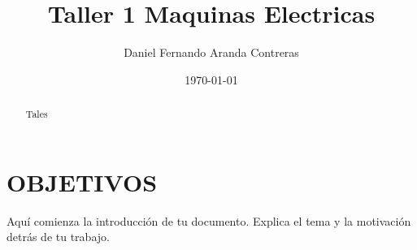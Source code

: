 \documentclass[a4paper,12pt]{article} %
\begin{document}
    \title{Taller 1 Maquinas Electricas} %
    \author{Daniel Fernando Aranda Contreras} %
    \date{\today} %
    \maketitle %

    \begin{abstract}
            
            Tales
        \end{abstract}

        \section{OBJETIVOS }
        Aquí comienza la introducción de tu documento. Explica el tema y la motivación detrás de tu trabajo.
        \newpage
\end{document}
